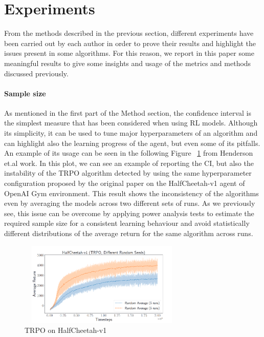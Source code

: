 \documentclass{article}
\begin{document}
\section{Experiments}
From the methods described in the previous section, different experiments have been carried out by each author in order to prove their results and highlight the issues present in some algorithms. For this reason, we report in this paper some meaningful results to give some insights and usage of the metrics and methods discussed previously.

\paragraph{Sample size}
As mentioned in the first part of the Method section, the confidence interval is the simplest measure that has been considered when using RL models. Although its simplicity, it can be used to tune major hyperparameters of an algorithm and can highlight also the learning progress of the agent, but even some of its pitfalls. An example of its usage can be seen in the following Figure ~\ref{fig:sample_size} from Henderson et.al work. In this plot, we can see an example of reporting the CI, but also the instability of the TRPO \cite{TRPO} algorithm detected by using the same hyperparameter configuration proposed by the original paper on the HalfCheetah-v1 agent of OpenAI Gym environment. This result shows the inconsistency of the algorithms even by averaging the models across two different sets of runs. As we previously see, this issue can be overcome by applying power analysis tests to estimate the required sample size for a consistent learning behaviour and avoid statistically different distributions of the average return for the same algorithm across runs.
\begin{figure}[!]
	\centering
	\includegraphics[width=8cm, height=4cm]{./images/sample_size_dist.png}
	\caption{TRPO on HalfCheetah-v1~\cite{DRL01}}
	\label{fig:sample_size}
\end{figure}
\end{document}

